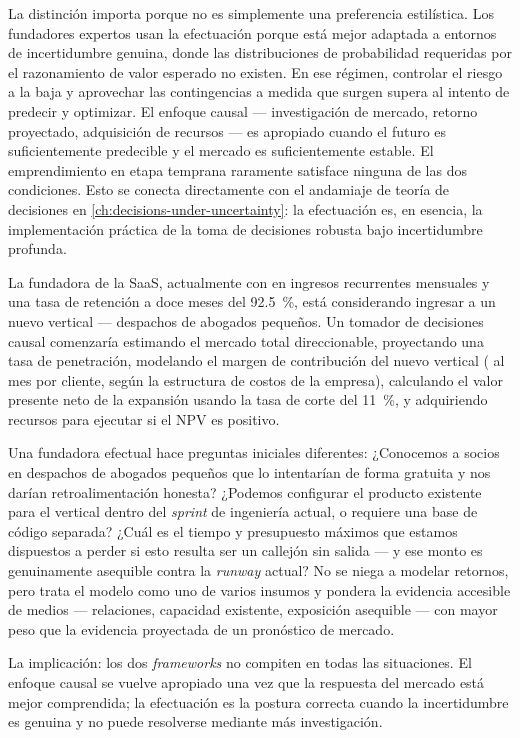 La distinción importa porque no es simplemente una preferencia estilística. Los fundadores
expertos usan la efectuación porque está mejor adaptada a entornos de incertidumbre genuina,
donde las distribuciones de probabilidad requeridas por el razonamiento de valor esperado no
existen. En ese régimen, controlar el riesgo a la baja y aprovechar las contingencias a medida
que surgen supera al intento de predecir y optimizar. El enfoque causal --- investigación de
mercado, retorno proyectado, adquisición de recursos --- es apropiado cuando el futuro es
suficientemente predecible y el mercado es suficientemente estable. El emprendimiento en etapa
temprana raramente satisface ninguna de las dos condiciones. Esto se conecta directamente con el
andamiaje de teoría de decisiones en \cref{ch:decisions-under-uncertainty}: la efectuación es,
en esencia, la implementación práctica de la toma de decisiones robusta bajo incertidumbre
profunda.

\begin{example}
La fundadora de la SaaS, actualmente con  en ingresos recurrentes mensuales y
una tasa de retención a doce meses del \qty{92.5}{\percent}, está considerando ingresar a un
nuevo vertical --- despachos de abogados pequeños. Un tomador de decisiones causal comenzaría
estimando el mercado total direccionable, proyectando una tasa de penetración, modelando el
margen de contribución del nuevo vertical ( al mes por cliente, según la estructura de
costos de la empresa), calculando el valor presente neto de la expansión usando la tasa de corte
del \qty{11}{\percent}, y adquiriendo recursos para ejecutar si el NPV es positivo.

Una fundadora efectual hace preguntas iniciales diferentes: ¿Conocemos a socios en despachos de
abogados pequeños que lo intentarían de forma gratuita y nos darían retroalimentación honesta?
¿Podemos configurar el producto existente para el vertical dentro del \emph{sprint} de
ingeniería actual, o requiere una base de código separada? ¿Cuál es el tiempo y presupuesto
máximos que estamos dispuestos a perder si esto resulta ser un callejón sin salida --- y ese
monto es genuinamente asequible contra la \emph{runway} actual? No se niega a modelar retornos,
pero trata el modelo como uno de varios insumos y pondera la evidencia accesible de medios ---
relaciones, capacidad existente, exposición asequible --- con mayor peso que la evidencia
proyectada de un pronóstico de mercado.

La implicación: los dos \emph{frameworks} no compiten en todas las situaciones. El enfoque
causal se vuelve apropiado una vez que la respuesta del mercado está mejor comprendida; la
efectuación es la postura correcta cuando la incertidumbre es genuina y no puede resolverse
mediante más investigación.
\end{example}

